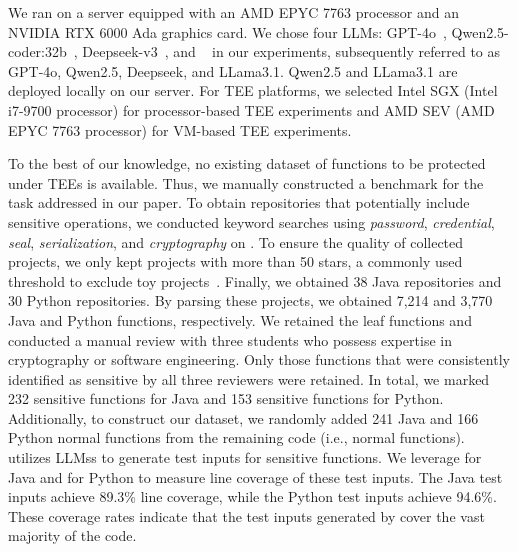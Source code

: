 \begin{description}[leftmargin = 0pt]
\item [Experiment Environment.]
We ran \system on a server equipped with an AMD EPYC 7763 processor and an NVIDIA RTX 6000 Ada graphics card.
We chose four LLMs: GPT-4o~\cite{openai2024gpt4o}, Qwen2.5-coder:32b~\cite{abs240912186}, Deepseek-v3~\cite{bi2024deepseek}, and ~\cite{abs230709288} in our experiments, subsequently referred to as GPT-4o, Qwen2.5, Deepseek, and LLama3.1.
Qwen2.5 and LLama3.1 are deployed locally on our server.
For TEE platforms, we selected Intel SGX (Intel i7-9700 processor) for processor-based TEE experiments and AMD SEV (AMD EPYC 7763 processor) for VM-based TEE experiments.

\item [Dataset Construction.]
To the best of our knowledge, no existing dataset of functions to be protected under TEEs is available.
Thus, we manually constructed a benchmark for the task addressed in our paper.
To obtain repositories that potentially include sensitive operations, we conducted keyword searches using \emph{password}, \emph{credential}, \emph{seal}, \emph{serialization}, and \emph{cryptography} on .
To ensure the quality of collected projects, we only kept projects with more than 50 stars, a commonly used threshold to exclude toy projects~\cite{han2023credential, feng2022automated}.
Finally, we obtained 38 Java repositories and 30 Python repositories.
By parsing these projects, we obtained 7,214 and 3,770 Java and Python functions, respectively.
We retained the leaf functions and conducted a manual review with three students who possess expertise in cryptography or software engineering.
Only those functions that were consistently identified as sensitive by all three reviewers were retained.
In total, we marked 232 sensitive functions for Java and 153 sensitive functions for Python.
Additionally, to construct our dataset, we randomly added 241 Java and 166 Python normal functions from the remaining code (i.e., normal functions).
\system utilizes LLMss to generate test inputs for sensitive functions.
We leverage  for Java and  for Python to measure line coverage of these test inputs.
The Java test inputs achieve 89.3\% line coverage, while the Python test inputs achieve 94.6\%.
These coverage rates indicate that the test inputs generated by \system cover the vast majority of the code.

\end{description}

